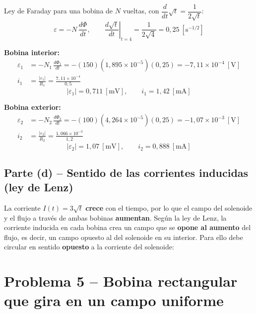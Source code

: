 \documentclass[12pt,letterpaper]{article}
\begin{document}
\noindent Ley de Faraday para una bobina de $N$ vueltas, con
$\dfrac{d}{dt}\sqrt{t} = \dfrac{1}{2\sqrt{t}}$:
\[
    \varepsilon = -N\,\frac{d\Phi}{dt},\qquad
    \left.\frac{d\sqrt{t}}{dt}\right|_{t=4} = \frac{1}{2\sqrt{4}} = 0{,}25\ [\text{s}^{-1/2}]
\]

\noindent\textbf{Bobina interior:}
\begin{align*}
    \varepsilon_1 &= -N_1\,\frac{d\Phi_1}{dt} = -(150)(1{,}895\times10^{-5})(0{,}25)
    = -7{,}11\times10^{-4}\ [\text{V}]\\[4pt]
    i_1 &= \frac{|\varepsilon_1|}{R_1} = \frac{7{,}11\times10^{-4}}{0{,}5}
\end{align*}
\[
    \boxed{|\varepsilon_1| = 0{,}711\ [\text{mV}],\qquad i_1 = 1{,}42\ [\text{mA}]}
\]

\noindent\textbf{Bobina exterior:}
\begin{align*}
    \varepsilon_2 &= -N_2\,\frac{d\Phi_2}{dt} = -(100)(4{,}264\times10^{-5})(0{,}25)
    = -1{,}07\times10^{-3}\ [\text{V}]\\[4pt]
    i_2 &= \frac{|\varepsilon_2|}{R_2} = \frac{1{,}066\times10^{-3}}{1{,}2}
\end{align*}
\[
    \boxed{|\varepsilon_2| = 1{,}07\ [\text{mV}],\qquad i_2 = 0{,}888\ [\text{mA}]}
\]

\subsection*{Parte (d) -- Sentido de las corrientes inducidas (ley de Lenz)}

La corriente $I(t) = 3\sqrt{t}$ \textbf{crece} con el tiempo, por lo que el campo del solenoide y el
flujo a trav\'es de ambas bobinas \textbf{aumentan}. Seg\'un la ley de Lenz, la corriente inducida en
cada bobina crea un campo que se \textbf{opone al aumento} del flujo, es decir, un campo opuesto al
del solenoide en su interior. Para ello debe circular en sentido \textbf{opuesto} a la corriente del
solenoide:
\begin{center}
\end{center}

\newpage
\section*{Problema 5 -- Bobina rectangular que gira en un campo uniforme}
\end{document}
